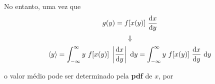 No entanto, uma vez que
    $$
g(y)  = f[x(y)] \ \displaystyle \frac{{\rm d}x}{{\rm d}y} $$
$$   \Downarrow $$
$$
  \langle y \rangle  = \displaystyle
  \int_{-\infty}^{\infty} y \  f[x(y)] \
  \left| \frac{{\rm d}x}{{\rm d}y} \right|  \ {\rm d}y  = \displaystyle
  \int_{-\infty}^{\infty} y \  f[x(y)] \
   \frac{{\rm d}x}{{\rm d}y}  \ {\rm d}y
  $$

\noindent
\vspace{0.3cm}
o valor m\'{e}dio pode ser determinado pela {\bf pdf} de $x$,  por

\vspace{.2cm}
\centerline{}


